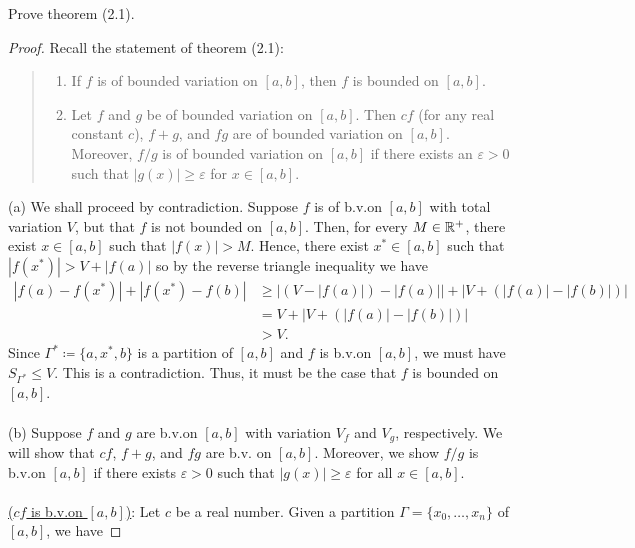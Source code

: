 \begin{problem}
Prove theorem (2.1).
\end{problem}
\begin{proof}
  Recall the statement of theorem (2.1):
  \begin{quote}
    \begin{enumerate}[label=(\alph*),noitemsep]
    \item If $f$ is of bounded variation on $[a,b]$, then $f$ is bounded on
      $[a,b]$.
    \item Let $f$ and $g$ be of bounded variation on $[a,b]$. Then $cf$
      (for any real constant $c$), $f+g$, and $fg$ are of bounded variation
      on $[a,b]$. Moreover, $f/g$ is of bounded variation on $[a,b]$ if
      there exists an $\varepsilon>0$ such that $|g(x)|\geq\varepsilon$ for
      $x\in[a,b]$.
    \end{enumerate}
  \end{quote}
  \noindent%
  (a) We shall proceed by contradiction. Suppose $f$ is of b.v.\@ on
  $[a,b]$ with total variation $V$, but that $f$ is not bounded on
  $[a,b]$. Then, for every $M\in\mathbb{R}^+$, there exist $x\in[a,b]$ such that
  $|f(x)|>M$. Hence, there exist $x^*\in[a,b]$ such that
  $|f(x^*)|>V+|f(a)|$ so by the reverse triangle inequality we have
  \begin{equation}
    \label{eq:1:3}
    \begin{aligned}
      |f(a)-f(x^*)|+|f(x^*)-f(b)| &\geq
      |(V-|f(a)|)-|f(a)||+|V+(|f(a)|-|f(b)|)|\\
      &=V+|V+(|f(a)|-|f(b)|)|\\
      &>V.
    \end{aligned}
  \end{equation}
  Since $\Gamma^*\coloneq\{a,x^*,b\}$ is a partition of $[a,b]$ and $f$ is
  b.v.\@ on $[a,b]$, we must have $S_{\Gamma^*}\leq V$. This is a
  contradiction. Thus, it must be the case that $f$ is bounded on
  $[a,b]$. %
  \\\\
  (b) Suppose $f$ and $g$ are b.v.\@ on $[a,b]$ with variation $V_f$ and
  $V_g$, respectively.  We will show that $cf$, $f+g$, and $fg$ are b.v.\@
  on $[a,b]$. Moreover, we show $f/g$ is b.v.\@ on $[a,b]$ if there exists
  $\varepsilon>0$ such that $|g(x)|\geq\varepsilon$ for all $x\in[a,b]$.
  \\\\
  \underline{($cf$ is b.v.\@ on $[a,b]$)}: Let $c$ be a real number. Given
  a partition $\Gamma=\{x_0,\dotsc,x_n\}$ of $[a,b]$, we have

\end{proof}
